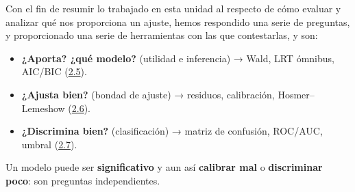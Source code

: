 \documentclass[
  letterpaper,
  DIV=11,
  numbers=noendperiod]{scrartcl}
\providecommand{\tightlist}{%
  \setlength{\itemsep}{0pt}\setlength{\parskip}{0pt}}\usepackage{longtable,booktabs,array}
\begin{document}
\begin{tcolorbox}[enhanced jigsaw, coltitle=black, rightrule=.15mm, arc=.35mm, leftrule=.75mm, colback=white, colbacktitle=quarto-callout-note-color!10!white, left=2mm, breakable, toptitle=1mm, toprule=.15mm, bottomtitle=1mm, titlerule=0mm, title=\textcolor{quarto-callout-note-color}{\faInfo}\hspace{0.5em}{Tres preguntas, tres herramientas}, bottomrule=.15mm, opacityback=0, opacitybacktitle=0.6, colframe=quarto-callout-note-color-frame]

Con el fin de resumir lo trabajado en esta unidad al respecto de cómo
evaluar y analizar qué nos proporciona un ajuste, hemos respondido una
serie de preguntas, y proporcionado una serie de herramientas con las
que contestarlas, y son:

\begin{itemize}
\tightlist
\item
  \textbf{¿Aporta? ¿qué modelo?} (utilidad e inferencia) → Wald, LRT
  ómnibus, AIC/BIC (\protect\hyperlink{sec-u12-inferencia}{2.5}).
\item
  \textbf{¿Ajusta bien?} (bondad de ajuste) → residuos, calibración,
  Hosmer--Lemeshow (\protect\hyperlink{sec-u12-diagnostico}{2.6}).
\item
  \textbf{¿Discrimina bien?} (clasificación) → matriz de confusión,
  ROC/AUC, umbral (\protect\hyperlink{sec-u12-evaluacion}{2.7}).
\end{itemize}

Un modelo puede ser \textbf{significativo} y aun así \textbf{calibrar
mal} o \textbf{discriminar poco}: son preguntas independientes.

\end{tcolorbox}
\end{document}
